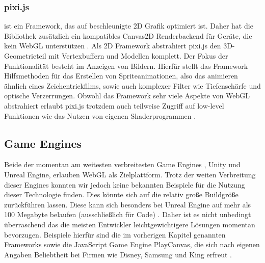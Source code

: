 \subsubsection*{pixi.js}\cite{pixiGithub} ist ein Framework, das auf beschleunigte 2D Grafik optimiert ist. Daher hat die Bibliothek zusätzlich ein kompatibles Canvas2D Renderbackend für Geräte, die kein WebGL unterstützen \cite{pixiGithub}. Als 2D Framework abstrahiert pixi.js den 3D-Geometrieteil mit Vertexbuffern und Modellen komplett. Der Fokus der Funktionalität besteht im Anzeigen von Bildern. Hierfür stellt das Framework Hilfsmethoden für das Erstellen von Spriteanimationen, also das animieren ähnlich eines Zeichentrickfilms, sowie auch komplexer Filter wie Tiefenschärfe und optische Verzerrungen. Obwohl das Framework sehr viele Aspekte von WebGL abstrahiert erlaubt pixi.js trotzdem auch teilweise Zugriff auf low-level Funktionen wie das Nutzen von eigenen Shaderprogrammen \cite{pixiShaders}.
\subsection{Game Engines}
Beide der momentan am weitesten verbreitesten Game Engines \cite{UnityDist}\cite{EngineDist}, Unity und Unreal Engine, erlauben WebGL als Zielplattform. Trotz der weiten Verbreitung dieser Engines konnten wir jedoch keine bekannten Beispiele für die Nutzung dieser Technologie finden. Dies könnte sich auf die relativ große Buildgröße zurückführen lassen. Diese kann sich besonders bei Unreal Engine auf mehr als 100 Megabyte belaufen (ausschließlich für Code) \cite{unrealFileSize}. Daher ist es nicht unbedingt überraschend das die meisten Entwickler leichtgewichtigere Lösungen momentan bevorzugen. Beispiele hierfür sind die im vorherigen Kapitel genannten Frameworks sowie die JavaScript Game Engine PlayCanvas, die sich nach eigenen Angaben Beliebtheit bei Firmen wie Disney, Samsung und King erfreut \cite{playCanGithub}.
